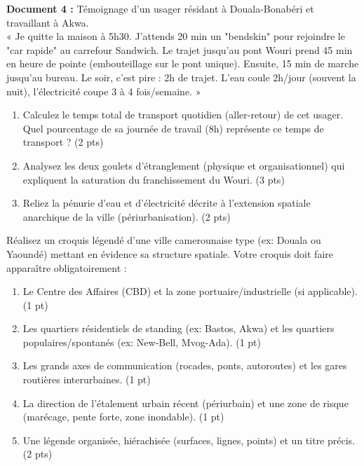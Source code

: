 \documentclass[11pt]{article}
\begin{document}
\begin{exercice}
\textbf{Document 4 :} Témoignage d'un usager résidant à Douala-Bonabéri et travaillant à Akwa. \\
« Je quitte la maison à 5h30. J'attends 20 min un "bendskin" pour rejoindre le "car rapide" au carrefour Sandwich. Le trajet jusqu'au pont Wouri prend 45 min en heure de pointe (embouteillage sur le pont unique). Ensuite, 15 min de marche jusqu'au bureau. Le soir, c'est pire : 2h de trajet. L'eau coule 2h/jour (souvent la nuit), l'électricité coupe 3 à 4 fois/semaine. »
\begin{enumerate}
    \item Calculez le temps total de transport quotidien (aller-retour) de cet usager. Quel pourcentage de sa journée de travail (8h) représente ce temps de transport ? (2 pts)
    \item Analysez les deux goulets d'étranglement (physique et organisationnel) qui expliquent la saturation du franchissement du Wouri. (3 pts)
    \item Reliez la pénurie d'eau et d'électricité décrite à l'extension spatiale anarchique de la ville (périurbanisation). (2 pts)
\end{enumerate}
\end{exercice}

\begin{exercice}
Réalisez un croquis légendé d'une ville camerounaise type (ex: Douala ou Yaoundé) mettant en évidence sa structure spatiale. Votre croquis doit faire apparaître obligatoirement :
\begin{enumerate}
    \item Le Centre des Affaires (CBD) et la zone portuaire/industrielle (si applicable). (1 pt)
    \item Les quartiers résidentiels de standing (ex: Bastos, Akwa) et les quartiers populaires/spontanés (ex: New-Bell, Mvog-Ada). (1 pt)
    \item Les grands axes de communication (rocades, ponts, autoroutes) et les gares routières interurbaines. (1 pt)
    \item La direction de l'étalement urbain récent (périurbain) et une zone de risque (marécage, pente forte, zone inondable). (1 pt)
    \item Une légende organisée, hiérachisée (surfaces, lignes, points) et un titre précis. (2 pts)
\end{enumerate}
\end{exercice}
\end{document}
